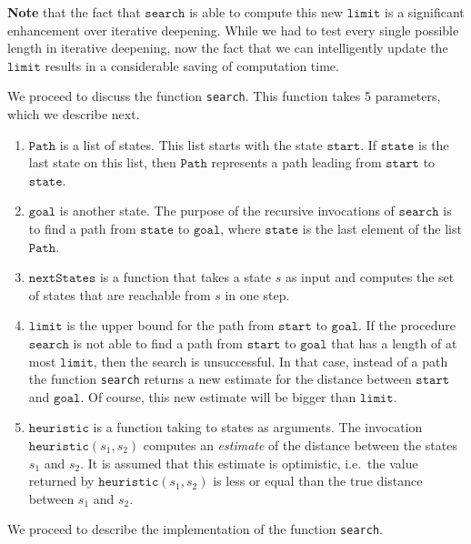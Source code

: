 \begin{enumerate}
\begin{enumerate}
            \textbf{Note} that the fact that $\texttt{search}$ is able to compute this new $\texttt{limit}$ is
            a significant enhancement over iterative deepening.  While we had to test every single possible
            length in iterative deepening, now the fact that we can intelligently update the $\texttt{limit}$
            results in a considerable saving of computation time.
      \end{enumerate}
\end{enumerate}
We proceed to discuss the function \texttt{search}. This function takes 5 parameters, which we describe next.
\begin{enumerate}
\item $\texttt{Path}$ is a list of states.  This list starts with the state $\texttt{start}$.
      If $\texttt{state}$ is the last state on this list, then $\texttt{Path}$ represents a path leading from
      $\texttt{start}$ to $\texttt{state}$.
\item $\texttt{goal}$ is another state.  The purpose of the recursive invocations of $\texttt{search}$ is to
      find a path from $\texttt{state}$ to $\texttt{goal}$, where $\texttt{state}$ is the last element of the
      list $\texttt{Path}$.
\item $\texttt{nextStates}$ is a function that takes a state $s$ as input and computes the set of states that are
      reachable from $s$ in one step.
\item $\texttt{limit}$ is the upper bound for the path from $\texttt{start}$ to $\texttt{goal}$.  If the
      procedure $\texttt{search}$ is not able to find a path from $\texttt{start}$ to $\texttt{goal}$ that has
      a length of at most $\texttt{limit}$, then the search is unsuccessful.  In that case, instead of a path
      the function \texttt{search} returns a new estimate for the distance between $\texttt{start}$ and
      $\texttt{goal}$.  Of course, this new estimate will be bigger than $\texttt{limit}$.
\item $\texttt{heuristic}$ is a function taking to states as arguments.  The invocation
      $\texttt{heuristic}(s_1, s_2)$ computes an \emph{estimate} of the distance between the states $s_1$ and $s_2$.  It is
      assumed that this estimate is optimistic, i.e.~the value returned by $\texttt{heuristic}(s_1, s_2)$
      is less or equal than the true distance between $s_1$ and $s_2$.
\end{enumerate}
We proceed to describe the implementation of the function \texttt{search}.
